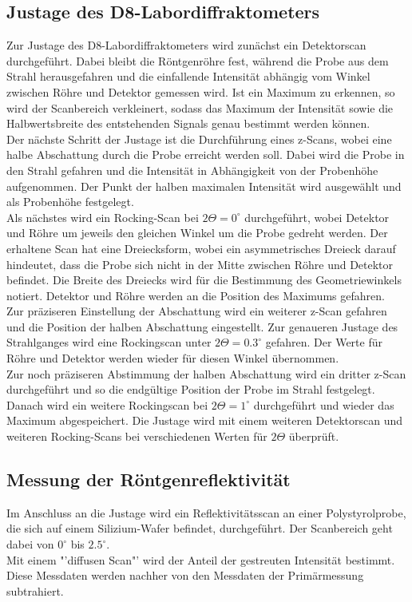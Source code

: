 \documentclass[captions=tableheading]{scrartcl}
\begin{document}
\subsection{Justage des D8-Labordiffraktometers}
Zur Justage des D8-Labordiffraktometers wird zunächst ein Detektorscan durchgeführt. Dabei bleibt die Röntgenröhre fest, während die Probe aus dem Strahl herausgefahren und die einfallende Intensität abhängig vom Winkel zwischen Röhre und Detektor gemessen wird. Ist ein Maximum zu erkennen, so wird der Scanbereich verkleinert, sodass das Maximum der Intensität sowie die Halbwertsbreite des entstehenden Signals genau bestimmt werden können. \\
Der nächste Schritt der Justage ist die Durchführung eines z-Scans, wobei eine halbe Abschattung durch die Probe erreicht werden soll. Dabei wird die Probe in den Strahl gefahren und die Intensität in Abhängigkeit von der Probenhöhe aufgenommen. Der Punkt der halben maximalen Intensität wird ausgewählt und als Probenhöhe festgelegt. \\
Als nächstes wird ein Rocking-Scan bei $2\Theta=0^{\circ}$ durchgeführt, wobei Detektor und Röhre um jeweils den gleichen Winkel um die Probe gedreht werden. Der erhaltene Scan hat eine Dreiecksform, wobei ein asymmetrisches Dreieck darauf hindeutet, dass die Probe sich nicht in der Mitte zwischen Röhre und Detektor befindet. Die Breite des Dreiecks wird für die Bestimmung des Geometriewinkels notiert. Detektor und Röhre werden an die Position des Maximums gefahren. \\
Zur präziseren Einstellung der Abschattung wird ein weiterer z-Scan gefahren und die Position der halben Abschattung eingestellt. Zur genaueren Justage des Strahlganges wird eine Rockingscan unter $2\Theta=0.3^{\circ}$ gefahren. Der Werte für Röhre und Detektor werden wieder für diesen Winkel übernommen. \\
Zur noch präziseren Abstimmung der halben Abschattung wird ein dritter z-Scan durchgeführt und so die endgültige Position der Probe im Strahl festgelegt. Danach wird ein weitere Rockingscan bei $2\Theta=1^{\circ}$ durchgeführt und wieder das Maximum abgespeichert. Die Justage wird mit einem weiteren Detektorscan und weiteren Rocking-Scans bei verschiedenen Werten für $2\Theta$ überprüft.

\subsection{Messung der Röntgenreflektivität}
Im Anschluss an die Justage wird ein Reflektivitätsscan an einer Polystyrolprobe, die sich auf einem Silizium-Wafer befindet, durchgeführt. Der Scanbereich geht dabei von $0^{\circ}$ bis $2.5^{\circ}$. \\
Mit einem "'diffusen Scan"' wird der Anteil der gestreuten Intensität bestimmt. Diese Messdaten werden nachher von den Messdaten der Primärmessung subtrahiert.
\end{document}
